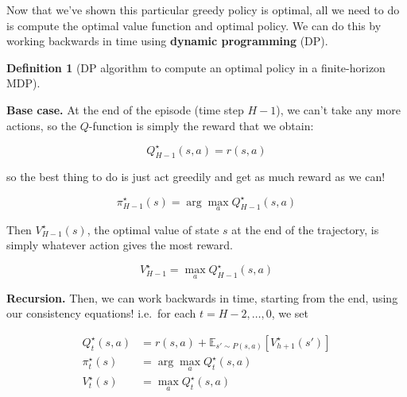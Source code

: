 \documentclass[
  letterpaper,
  DIV=11,
  numbers=noendperiod]{scrreprt}
\theoremstyle{plain}
\theoremstyle{plain}
\theoremstyle{definition}
\theoremstyle{definition}
\newtheorem{definition}{Definition}[chapter]
\theoremstyle{remark}
\begin{document}
Now that we've shown this particular greedy policy is optimal, all we
need to do is compute the optimal value function and optimal policy. We
can do this by working backwards in time using \textbf{dynamic
programming} (DP).

\begin{definition}[DP algorithm to compute an optimal policy in a
finite-horizon
MDP]\protect\hypertarget{def-pi_star_dp}{}\label{def-pi_star_dp}

\textbf{Base case.} At the end of the episode (time step \(H-1\)), we
can't take any more actions, so the \(Q\)-function is simply the reward
that we obtain:

\[Q^\star_{H-1}(s, a) = r(s, a)\]

so the best thing to do is just act greedily and get as much reward as
we can!

\[\pi^\star_{H-1}(s) = \arg\max_a Q^\star_{H-1}(s, a)\]

Then \(V^\star_{H-1}(s)\), the optimal value of state \(s\) at the end
of the trajectory, is simply whatever action gives the most reward.

\[V^\star_{H-1} = \max_a Q^\star_{H-1}(s, a)\]

\textbf{Recursion.} Then, we can work backwards in time, starting from
the end, using our consistency equations! i.e.~for each
\(t = H-2, \dots, 0\), we set

\[
\begin{aligned}
    Q^\star_{t}(s, a) &= r(s, a) + \mathbb{E}_{s' \sim P(s, a)} [V^\star_{h+1}(s')] \\
    \pi^\star_{t}(s) &= \arg\max_a Q^\star_{t}(s, a) \\
    V^\star_{t}(s) &= \max_a Q^\star_{t}(s, a)
\end{aligned}
\]

\end{definition}
\end{document}
